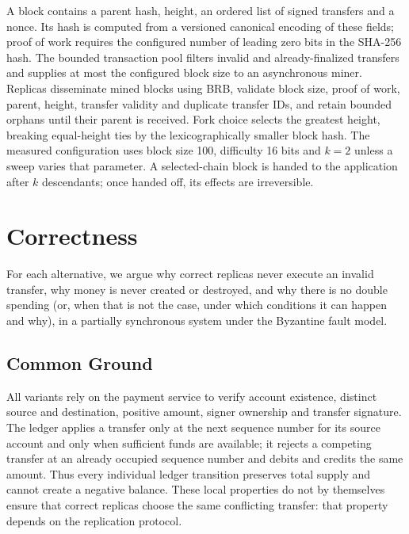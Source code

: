 \documentclass[sigconf,a4paper]{acmart}
\begin{document}
    A block contains a parent hash, height, an ordered list of signed transfers
    and a nonce. Its hash is computed from a versioned canonical encoding of
    these fields; proof of work requires the configured number of leading zero
    bits in the SHA-256 hash. The bounded transaction pool filters invalid and
    already-finalized transfers and supplies at most the configured block size
    to an asynchronous miner. Replicas disseminate mined blocks using BRB,
    validate block size, proof of work, parent, height, transfer validity and
    duplicate transfer IDs, and retain bounded orphans until their parent is
    received. Fork choice selects the greatest height, breaking equal-height
    ties by the lexicographically smaller block hash. The measured configuration
    uses block size 100, difficulty 16 bits and $k=2$ unless a sweep varies that
    parameter. A selected-chain block is handed to the application after $k$
    descendants; once handed off, its effects are irreversible.

    \section{Correctness}
    \label{sec:correctness}

    For each alternative, we argue why correct replicas never execute an invalid
    transfer, why money is never created or destroyed, and why there is no double
    spending (or, when that is not the case, under which conditions it can
    happen and why), in a partially synchronous system under the Byzantine fault
    model.

    \subsection{Common Ground}

    All variants rely on the payment service to verify account existence,
    distinct source and destination, positive amount, signer ownership and
    transfer signature. The ledger applies a transfer only at the next sequence
    number for its source account and only when sufficient funds are available;
    it rejects a competing transfer at an already occupied sequence number and
    debits and credits the same amount. Thus every individual ledger transition
    preserves total supply and cannot create a negative balance. These local
    properties do not by themselves ensure that correct replicas choose the
    same conflicting transfer: that property depends on the replication protocol.
\end{document}

